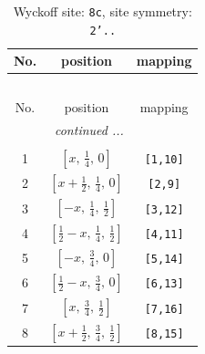 \documentclass[fleqn,8pt]{jsarticle}
\begin{document}
\begin{longtable}{ccc}
\caption{Wyckoff site: {\tt 8c}, site symmetry: {\tt 2'..}}
 \\
 \hline \hline
No. & position & mapping \\ \hline \endfirsthead

\multicolumn{2}{l}{\tablename\ \thetable{}} \\
 \hline \hline
No. & position & mapping \\ \hline \endhead

 \hline \hline
\multicolumn{2}{r}{\footnotesize\it continued ...} \\ \endfoot

 \hline \hline
\multicolumn{2}{r}{} \\ \endlastfoot

1 & $\left[ x,\, \frac{1}{4},\, 0 \right]$ & {\tt [1,10]} \\ \hline
2 & $\left[ x + \frac{1}{2},\, \frac{1}{4},\, 0 \right]$ & {\tt [2,9]} \\ \hline
3 & $\left[ - x,\, \frac{1}{4},\, \frac{1}{2} \right]$ & {\tt [3,12]} \\ \hline
4 & $\left[ \frac{1}{2} - x,\, \frac{1}{4},\, \frac{1}{2} \right]$ & {\tt [4,11]} \\ \hline
5 & $\left[ - x,\, \frac{3}{4},\, 0 \right]$ & {\tt [5,14]} \\ \hline
6 & $\left[ \frac{1}{2} - x,\, \frac{3}{4},\, 0 \right]$ & {\tt [6,13]} \\ \hline
7 & $\left[ x,\, \frac{3}{4},\, \frac{1}{2} \right]$ & {\tt [7,16]} \\ \hline
8 & $\left[ x + \frac{1}{2},\, \frac{3}{4},\, \frac{1}{2} \right]$ & {\tt [8,15]} \\
\end{longtable}
\renewcommand{\arraystretch}{1.2}
\end{document}
